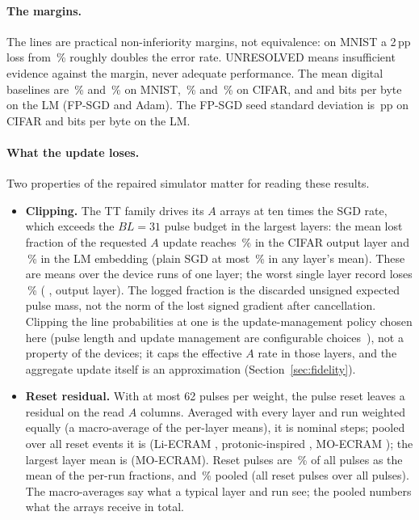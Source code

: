 \paragraph{The margins.} The lines are practical non-inferiority margins, not equivalence: on MNIST a 2\,pp loss from
\RVMnistFp\,\% roughly doubles the error rate. UNRESOLVED means insufficient evidence against the margin, never adequate
performance. The mean digital baselines are \RVMnistFp\,\% and \RVMnistAdamMetric\,\% on MNIST, \RVCifarFp\,\% and
\RVCifarAdamMetric\,\% on CIFAR, and \RVLmFp{} and \RVLmAdamMetric{} bits per byte on the LM (FP-SGD and Adam). The FP-SGD seed standard deviation is \RVCifarFpSd\,pp on CIFAR and \RVLmFpSd{} bits per byte on the LM.

\paragraph{What the update loses.} Two properties of the repaired simulator matter for reading these results.
\begin{itemize}
\item \textbf{Clipping.} The TT family drives its $A$ arrays at ten times the SGD rate, which exceeds the $BL=31$ pulse budget
      in the largest layers: the mean lost fraction of the requested $A$ update reaches \RVLostCifarTtLayerMeanMaxPct\,\% in the
      CIFAR output layer and \RVLostLmTtLayerMeanMaxPct\,\% in the LM embedding (plain SGD at most \RVLostLmSgdLayerMeanMaxPct\,\%
      in any layer's mean). These are means over the device runs of one layer; the worst single layer record loses
      \RVLostMaxPct\,\% (\RVLostWorstDev{} \RVLostWorstAlg, \RVLostWorstTask{} output layer). The logged fraction is the
      discarded unsigned expected pulse mass, not the norm of the lost signed gradient after cancellation. Clipping the line
      probabilities at one is the update-management policy chosen here (pulse length and update management are configurable
      choices~\cite{rasch2021aihwkit}), not a property of the devices; it caps the effective $A$ rate in those layers, and the
      aggregate update itself is an approximation (Section~\ref{sec:fidelity}).
\item \textbf{Reset residual.} With at most 62 pulses per weight, the pulse reset leaves a residual on the read $A$
      columns. Averaged with every layer and run weighted equally (a macro-average of the per-layer means), it is
      \RVResetResidMean{} nominal steps; pooled over all reset events it is \RVResetResidPooled{} (Li-ECRAM
      \RVResetResidPooledEcramLiTangTwoZeroOneEight, protonic-inspired \RVResetResidPooledProtonicOnenTwoZeroTwoTwo, MO-ECRAM
      \RVResetResidPooledEcramMoKimTwoZeroOneNine); the largest layer mean is \RVResetResidMax{} (MO-ECRAM). Reset pulses are
      \RVResetShareMean\,\% of all pulses as the mean of the per-run fractions, and \RVResetSharePooled\,\% pooled (all reset
      pulses over all pulses). The macro-averages say what a typical layer and run see; the pooled numbers what the arrays
      receive in total.
\end{itemize}

